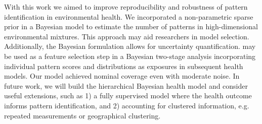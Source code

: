 With this work we aimed to improve reproducibility and robustness of pattern identification in environmental health. We incorporated a non-parametric sparse prior in a Bayesian model to estimate the number of patterns in high-dimensional environmental mixtures. This approach may aid researchers in model selection. Additionally, the Bayesian formulation allows for uncertainty quantification. \bnmf may be used as a feature selection step in a Bayesian two-stage analysis incorporating individual pattern scores and distributions as exposures in subsequent health models. Our model achieved nominal coverage even with moderate noise. In future work, we will build the hierarchical Bayesian health model and consider useful extensions, such as 1) a fully supervised model where the health outcome informs pattern identification, and 2) accounting for clustered information, e.g. repeated measurements or geographical clustering.

